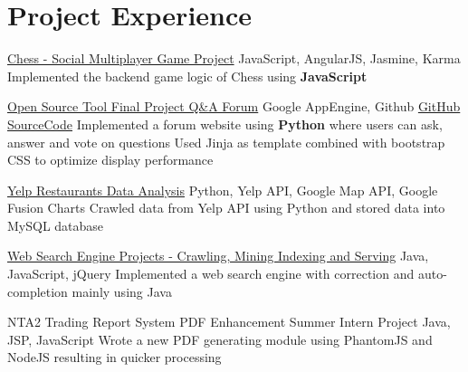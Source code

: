 \documentclass[11pt,a4paper,sans]{moderncv}   %
\begin{document}
\section{Project Experience}
\renewcommand{\baselinestretch}{1.0}
{\href{https://github.com/cz764/Chess}{Chess - Social Multiplayer Game Project}}
{JavaScript, AngularJS, Jasmine, Karma}
{}{}
{
{Implemented the backend game logic of Chess using \textbf{JavaScript}}
}

{\href{http://chenzhuost.appspot.com/}{Open Source Tool Final Project Q\&A Forum}}
{Google AppEngine, Github}
{\href{https://github.com/cz764/OpenSourceTool_FinalProject}{GitHub SourceCode}}{}
{
{Implemented a forum website using \textbf{Python} where users can ask, answer and vote on questions}
\newline
{Used Jinja as template combined with bootstrap CSS to optimize display performance}
}



{\href{https://github.com/cz764/DealingWithData_FinalProject}{Yelp Restaurants Data Analysis}}
{Python, Yelp API, Google Map API, Google Fusion Charts}
{}{}
{
{Crawled data from Yelp API using Python and stored data into MySQL database}
}


{\href{https://github.com/patronpengiun/WebSearchEngine}{Web Search Engine Projects - Crawling, Mining Indexing and Serving}}
{Java, JavaScript, jQuery}
{}{}
{{Implemented a web search engine with correction and auto-completion mainly using Java}
}

{NTA2 Trading Report System PDF Enhancement Summer Intern Project}
{Java, JSP, JavaScript}
{}{}
{{Wrote a new PDF generating module using PhantomJS and NodeJS resulting in quicker processing}
}
\end{document}
